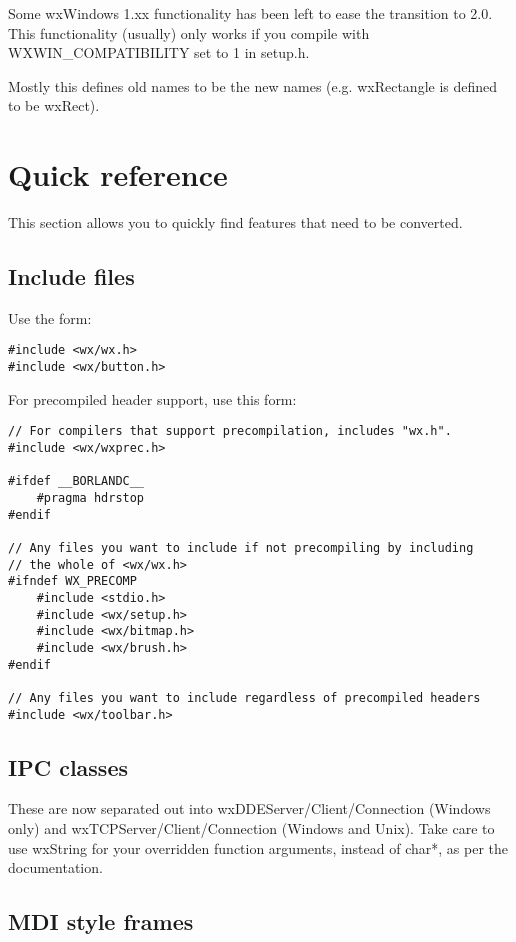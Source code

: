 Some wxWindows 1.xx functionality has been left to ease the transition to 2.0. This functionality
(usually) only works if you compile with WXWIN\_COMPATIBILITY set to 1 in setup.h.

Mostly this defines old names to be the new names (e.g. wxRectangle is defined to be wxRect).

\chapter{Quick reference}\label{quickreference}

This section allows you to quickly find features that
need to be converted.

\section{Include files}

Use the form:

\begin{verbatim}
#include <wx/wx.h>
#include <wx/button.h>
\end{verbatim}

For precompiled header support, use this form:

\begin{verbatim}
// For compilers that support precompilation, includes "wx.h".
#include <wx/wxprec.h>

#ifdef __BORLANDC__
    #pragma hdrstop
#endif

// Any files you want to include if not precompiling by including
// the whole of <wx/wx.h>
#ifndef WX_PRECOMP
    #include <stdio.h>
    #include <wx/setup.h>
    #include <wx/bitmap.h>
    #include <wx/brush.h>
#endif

// Any files you want to include regardless of precompiled headers
#include <wx/toolbar.h>
\end{verbatim}

\section{IPC classes}

These are now separated out into wxDDEServer/Client/Connection (Windows only) and wxTCPServer/Client/Connection
(Windows and Unix). Take care to use wxString for your overridden function arguments, instead of char*, as per
the documentation.

\section{MDI style frames}

